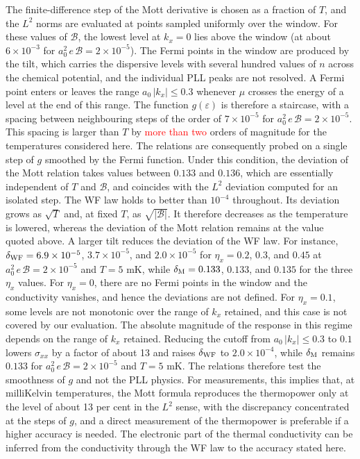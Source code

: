 \documentclass[aps,prb, onecolumn, nofootinbib, citeautoscript,10pt]{revtex4-2}
\begin{document}
The finite-difference step of the Mott derivative is chosen as a fraction of $T$, and the $L^2$ norms are evaluated at points sampled uniformly over the window. For these values of $\mathcal B$, the lowest level at $k_x=0$ lies above the window (at about $6\times10^{-3}$ for $a_0^2\,e\,\mathcal B=2\times10^{-5}$). The Fermi points in the window are produced by the tilt, which carries the dispersive levels with several hundred values of $n$ across the chemical potential, and the individual PLL peaks are not resolved. A Fermi point enters or leaves the range $a_0\,|k_x|\le0.3$ whenever $\mu$ crosses the energy of a level at the end of this range. The function $g(\varepsilon)$ is therefore a staircase, with a spacing between neighbouring steps of the order of $7\times10^{-5}$ for $a_0^2\,e\,\mathcal B=2\times10^{-5}$. This spacing is larger than $T$ by \textcolor{red}{more than two} orders of magnitude for the temperatures considered here. The relations are consequently probed on a single step of $g$ smoothed by the Fermi function. Under this condition, the deviation of the Mott relation takes values between $0.133$ and $0.136$, which are essentially independent of $T$ and $\mathcal B$, and coincides with the $L^2$ deviation computed for an isolated step. The WF law holds to better than $10^{-4}$ throughout. Its deviation grows as $\sqrt{T}$ and, at fixed $T$, as $\sqrt{|\mathcal B|}$. It therefore decreases as the temperature is lowered, whereas the deviation of the Mott relation remains at the value quoted above. A larger tilt reduces the deviation of the WF law. For instance, $\delta_{\rm WF}=6.9\times10^{-5}$, $3.7\times10^{-5}$, and $2.0\times10^{-5}$ for $\eta_x=0.2$, $0.3$, and $0.45$ at $a_0^2\,e\,\mathcal B=2\times10^{-5}$ and $T=5$ mK, while $\delta_{\rm M}=0.133$, $0.133$, and $0.135$ for the three $\eta_x$ values. For $\eta_x=0$, there are no Fermi points in the window and the conductivity vanishes, and hence the deviations are not defined. For $\eta_x=0.1$, some levels are not monotonic over the range of $k_x$ retained, and this case is not covered by our evaluation. The absolute magnitude of the response in this regime depends on the range of $k_x$ retained. Reducing the cutoff from $a_0\,|k_x|\le0.3$ to $0.1$ lowers $\sigma_{xx}$ by a factor of about 13 and raises $\delta_{\rm WF}$ to $2.0\times10^{-4}$, while $\delta_{\rm M}$ remains $0.133$ for $a_0^2\,e\,\mathcal B=2\times10^{-5}$ and $T=5$ mK. The relations therefore test the smoothness of $g$ and not the PLL physics. For measurements, this implies that, at milliKelvin temperatures, the Mott formula reproduces the thermopower only at the level of about 13 per cent in the $L^2$ sense, with the discrepancy concentrated at the steps of $g$, and a direct measurement of the thermopower is preferable if a higher accuracy is needed. The electronic part of the thermal conductivity can be inferred from the conductivity through the WF law to the accuracy stated here.
\end{document}
